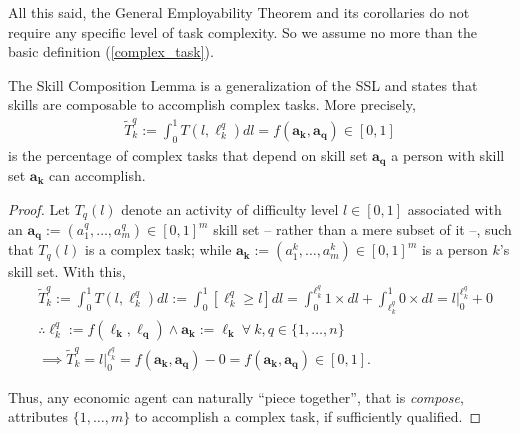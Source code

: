 \documentclass[hidelinks, nonatbib]{elsarticle}
\begin{document}
All this said, the General Employability Theorem and its corollaries do not require any specific level of task complexity. So we assume no more than the basic definition (\ref{complex_task}). 
\begin{lemma}
    \label{scl}
    The Skill Composition Lemma is a generalization of the SSL and states that skills are composable to accomplish complex tasks. More precisely,
    \begin{gather}
        \tilde{T}_{k}^{q}
        :=
        \int_{0}^{1}
        T(l, \ell_{k}^{q})
        dl
        =
        f(\boldsymbol{a_k}, \boldsymbol{a_q})
        \in
        [0,1]
    \end{gather}
    is the percentage of complex tasks that depend on skill set $\boldsymbol{a_q}$ a person with skill set 
    $\boldsymbol{a_k}$ can accomplish.
    \begin{proof}
        Let $T_{q}(l)$ denote an activity of difficulty level $l \in [0,1]$ associated with an $\boldsymbol{a_q} := (a_{1}^{q}, \dots, a_{m}^{q}) \in [0,1]^m$ skill set -- rather than a mere subset of it --, such that $T_{q}(l)$ is a complex task; while $\boldsymbol{a_k} := (a_{1}^{k}, \dots, a_{m}^{k}) \in [0,1]^m$ is a person $k$'s skill set. With this,
        \begin{align}
            &
            \tilde{T}_{k}^{q}
            :=
            \int_{0}^{1}
            T(l, \ell_{k}^{q})
            dl
            :=
            \int_{0}^{1}
            [
                \ell_{k}^{q}
                \geq
                l
            ]
            dl
            =
            \int_{0}^{\ell_{k}^{q}}
            1
            \times
            dl
            +
            \int_{\ell_{k}^{q}}^{1}
            0
            \times
            dl
            =
            l\big|_{0}^{\ell_{k}^{q}}
            + 0
            \\
            &
            \therefore
            \ell_{k}^{q}
            :=
            f(\boldsymbol{\ell_k}, \boldsymbol{\ell_q})
            \land
            \boldsymbol{a_k}
            :=
            \boldsymbol{\ell_k}
            \
            \forall
            \
            k,q \in \{1, \dots, n\}
            \\
            &
            \implies
            \tilde{T}_{k}^{q}
            =
            l\big|_{0}^{\ell_{k}^{q}}
            =
            f(\boldsymbol{a_k}, \boldsymbol{a_q})
            - 0
            =
            f(\boldsymbol{a_k}, \boldsymbol{a_q})
            \in
            [0,1]
            .
        \end{align}
        
        Thus, any economic agent can naturally ``piece together'', that is \textit{compose}, attributes $\{1, \dots, m\}$ to accomplish a complex task, if sufficiently qualified.
    \end{proof}
\end{lemma}
\end{document}
